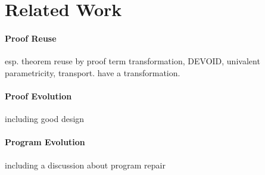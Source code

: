 \section{Related Work}

\paragraph{Proof Reuse}

esp. theorem reuse by proof term transformation, DEVOID, univalent parametricity, transport. \cite{magaud2000changing} have a transformation.

\paragraph{Proof Evolution}

including good design

\paragraph{Program Evolution}

including a discussion about program repair

